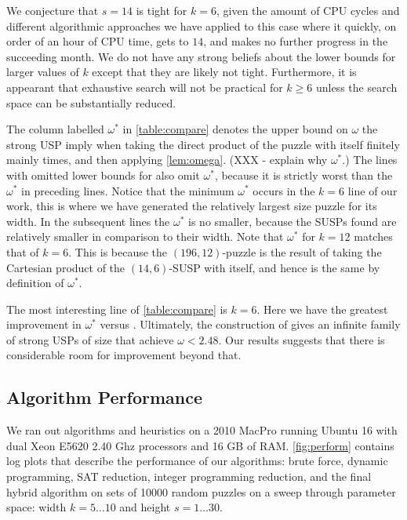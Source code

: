 \documentclass[11pt]{article}
\begin{document}
We conjecture that $s = 14$ is tight for $k = 6$, given the amount of
CPU cycles and different algorithmic approaches we have applied to
this case where it quickly, on order of an hour of CPU time, gets to
$14$, and makes no further progress in the succeeding month.  We do
not have any strong beliefs about the lower bounds for larger values
of $k$ except that they are likely not tight.  Furthermore, it is
appearant that exhaustive search will not be practical for $k \ge 6$
unless the search space can be substantially reduced.

The column labelled $\omega^*$ in \autoref{table:compare} denotes the
upper bound on $\omega$ the strong USP imply when taking the direct
product of the puzzle with itself finitely mainly times, and then
applying \autoref{lem:omega}.  (XXX - explain why $\omega ^*$.)  The
lines with omitted lower bounds for \cite{cksu05} also omit
$\omega^*$, because it is strictly worst than the $\omega^*$ in
preceding lines.  Notice that the minimum $\omega^*$ occurs in the $k
= 6$ line of our work, this is where we have generated the relatively
largest size puzzle for its width.  In the subsequent lines the
$\omega^*$ is no smaller, because the SUSPs found are relatively
smaller in comparison to their width.  Note that $\omega^*$ for $k =
12$ matches that of $k = 6$.  This is because the $(196, 12)$-puzzle
is the result of taking the Cartesian product of the $(14,6)$-SUSP
with itself, and hence is the same by definition of $\omega^*$.

The most interesting line of \autoref{table:compare} is $k = 6$.  Here
we have the greatest improvement in $\omega^*$ versus \cite{cksu05}.
Ultimately, the construction of \cite[Proposition 3.8]{cksu05} gives
an infinite family of strong USPs of size that achieve $\omega <
2.48$. Our results suggests that there is considerable room for
improvement beyond that.


\subsection{Algorithm Performance}
\label{subsec:performance}

We ran out algorithms and heuristics on a 2010 MacPro running Ubuntu
16 with dual Xeon E5620 2.40 Ghz processors and 16 GB of
RAM. \autoref{fig:perform} contains log plots that describe the
performance of our algorithms: brute force, dynamic programming, SAT
reduction, integer programming reduction, and the final hybrid
algorithm on sets of 10000 random puzzles on a sweep through parameter
space: width $k = 5 \ldots 10$ and height $s = 1 \ldots 30$.
\end{document}
